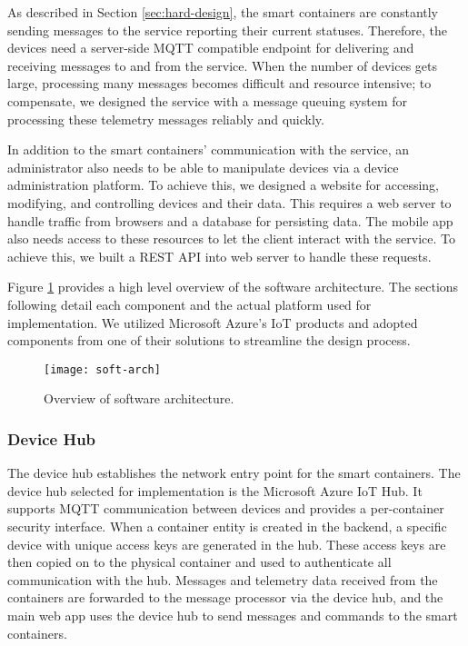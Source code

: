 As described in Section \ref{sec:hard-design}, the smart containers are constantly sending messages to the service reporting their current statuses. Therefore, the devices need a server-side MQTT compatible endpoint for delivering and receiving messages to and from the service. When the number of devices gets large, processing many messages becomes difficult and resource intensive; to compensate, we designed the service with a message queuing system for processing these telemetry messages reliably and quickly. 

In addition to the smart containers' communication with the service, an administrator also needs to be able to manipulate devices via a device administration platform. To achieve this, we designed a website for accessing, modifying, and controlling devices and their data. This requires a web server to handle traffic from browsers and a database for persisting data. The mobile app also needs access to these resources to let the client interact with the service. To achieve this, we built a REST API into web server to handle these requests.

Figure \ref{fig:soft-arch} provides a high level overview of the software architecture. The sections following detail each component and the actual platform used for implementation. We utilized Microsoft Azure's IoT products and adopted components from one of their solutions \cite{azure-iot-walk} to streamline the design process.

\begin{figure}[h]
\texttt{[image: soft-arch]}
\caption{Overview of software architecture.}
\label{fig:soft-arch}
\end{figure}

\subsubsection{Device Hub}

The device hub establishes the network entry point for the smart containers. The device hub selected for implementation is the Microsoft Azure IoT Hub. It supports MQTT communication between devices and provides a per-container security interface. When a container entity is created in the backend, a specific device with unique access keys are generated in the hub. These access keys are then copied on to the physical container and used to authenticate all communication with the hub. Messages and telemetry data received from the containers are forwarded to the message processor via the device hub, and the main web app uses the device hub to send messages and commands to the smart containers.

